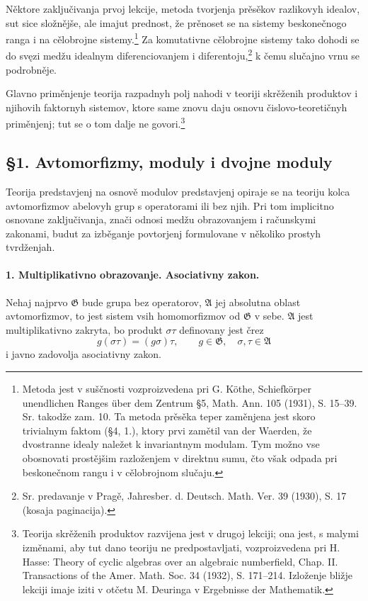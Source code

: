 \documentclass[11pt]{article}
\newcommand{\foreign}[1]{#1}
\providecommand{\frA}{\mathfrak A}
\providecommand{\frG}{\mathfrak G}
\begin{document}
Něktore zaključivanja prvoj lekcije, metoda tvorjenja prěsěkov razlikovyh idealov, sut sice složnějše, ale imajut prednost, že prěnoset se na sistemy beskonečnogo ranga i na cělobrojne sistemy.\footnote{Metoda jest v suščnosti vozproizvedena pri G. Köthe, \foreign{Schiefkörper unendlichen Ranges über dem Zentrum} §5, Math. Ann. 105 (1931), S. 15--39. Sr. takodže zam. 10. Ta metoda prěsěka teper zaměnjena jest skoro trivialnym faktom (§4, 1.), ktory prvi zamětil van der Waerden, že dvostranne idealy naležet k invariantnym modulam. Tym možno vse obosnovati prostějšim razloženjem v direktnu sumu, čto však odpada pri beskonečnom rangu i v cělobrojnom slučaju.} Za komutativne cělobrojne sistemy tako dohodi se do svęzi medžu idealnym diferenciovanjem i diferentoju,\footnote{Sr. predavanje v Pragě, Jahresber. d. Deutsch. Math. Ver. 39 (1930), S. 17 (kosaja paginacija).} k čemu slučajno vrnu se podrobněje.

Glavno priměnjenje teorija razpadnyh polj nahodi v teoriji skrěženih produktov i njihovih faktornyh sistemov, ktore same znovu daju osnovu čislovo-teoretičnyh priměnjenj; tut se o tom dalje ne govori.\footnote{Teorija skrěženih produktov razvijena jest v drugoj lekciji; ona jest, s malymi izměnami, aby tut dano teoriju ne predpostavljati, vozproizvedena pri H. Hasse: \foreign{Theory of cyclic algebras over an algebraic numberfield}, Chap. II. Transactions of the Amer. Math. Soc. 34 (1932), S. 171--214. Izloženje bližje lekciji imaje iziti v otčetu M. Deuringa v \foreign{Ergebnisse der Mathematik}.}

\subsection*{§1. Avtomorfizmy, moduly i dvojne moduly}

Teorija predstavjenj na osnově modulov predstavjenj opiraje se na teoriju kolca avtomorfizmov abelovyh grup s operatorami ili bez njih. Pri tom implicitno osnovane zaključivanja, znači odnosi medžu obrazovanjem i računskymi zakonami, budut za izběganje povtorjenj formulovane v několiko prostyh tvrdženjah.

\paragraph{1. Multiplikativno obrazovanje. Asociativny zakon.}
Nehaj najprvo \(\frG\) bude grupa bez operatorov, \(\frA\) jej absolutna oblast avtomorfizmov, to jest sistem vsih homomorfizmov od \(\frG\) v sebe. \(\frA\) jest multiplikativno zakryta, bo produkt \( \sigma\tau \) definovany jest črez
\[
        g(\sigma\tau)=(g\sigma)\tau,
        \qquad g\in\frG,\quad \sigma,\tau\in\frA                         \tag{1}
\]
i javno zadovolja asociativny zakon.
\end{document}
